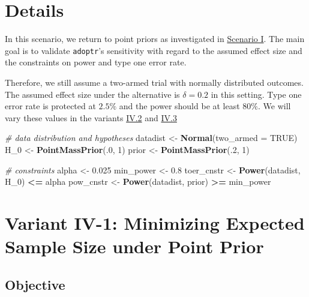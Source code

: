 \documentclass[]{book}
\newenvironment{Shaded}{\begin{snugshade}}{\end{snugshade}}
\newcommand{\CommentTok}[1]{\textcolor[rgb]{0.56,0.35,0.01}{\textit{#1}}}
\newcommand{\DataTypeTok}[1]{\textcolor[rgb]{0.13,0.29,0.53}{#1}}
\newcommand{\DecValTok}[1]{\textcolor[rgb]{0.00,0.00,0.81}{#1}}
\newcommand{\FloatTok}[1]{\textcolor[rgb]{0.00,0.00,0.81}{#1}}
\newcommand{\KeywordTok}[1]{\textcolor[rgb]{0.13,0.29,0.53}{\textbf{#1}}}
\newcommand{\NormalTok}[1]{#1}
\newcommand{\OperatorTok}[1]{\textcolor[rgb]{0.81,0.36,0.00}{\textbf{#1}}}
\newcommand{\OtherTok}[1]{\textcolor[rgb]{0.56,0.35,0.01}{#1}}
\newcommand{\StringTok}[1]{\textcolor[rgb]{0.31,0.60,0.02}{#1}}
\begin{document}
\hypertarget{details-3}{%
\section{Details}\label{details-3}}

In this scenario, we return to point priors as investigated in
\protect\hyperlink{scenarioI}{Scenario I}.
The main goal is to validate \texttt{adoptr}'s sensitivity with regard to
the assumed effect size and the constraints on power and type one error rate.

Therefore, we still assume a two-armed trial with normally distributed outcomes.
The assumed effect size under the alternative is \(\delta = 0.2\) in this setting.
Type one error rate is protected at \(2.5\%\) and the power should be at least
\(80\%\). We will vary these values in the variants \protect\hyperlink{variantIV.2}{IV.2} and
\protect\hyperlink{variantIV.3}{IV.3}

\begin{Shaded}
\begin{Highlighting}[]
\CommentTok{# data distribution and hypotheses}
\NormalTok{datadist   <-}\StringTok{ }\KeywordTok{Normal}\NormalTok{(}\DataTypeTok{two_armed =} \OtherTok{TRUE}\NormalTok{)}
\NormalTok{H_}\DecValTok{0}\NormalTok{        <-}\StringTok{ }\KeywordTok{PointMassPrior}\NormalTok{(.}\DecValTok{0}\NormalTok{, }\DecValTok{1}\NormalTok{)}
\NormalTok{prior      <-}\StringTok{ }\KeywordTok{PointMassPrior}\NormalTok{(.}\DecValTok{2}\NormalTok{, }\DecValTok{1}\NormalTok{)}

\CommentTok{# constraints}
\NormalTok{alpha      <-}\StringTok{ }\FloatTok{0.025}
\NormalTok{min_power  <-}\StringTok{ }\FloatTok{0.8}
\NormalTok{toer_cnstr <-}\StringTok{ }\KeywordTok{Power}\NormalTok{(datadist, H_}\DecValTok{0}\NormalTok{)   }\OperatorTok{<=}\StringTok{ }\NormalTok{alpha}
\NormalTok{pow_cnstr  <-}\StringTok{ }\KeywordTok{Power}\NormalTok{(datadist, prior) }\OperatorTok{>=}\StringTok{ }\NormalTok{min_power}
\end{Highlighting}
\end{Shaded}

\hypertarget{variantIV_1}{%
\section{Variant IV-1: Minimizing Expected Sample Size under Point Prior}\label{variantIV_1}}

\hypertarget{objective-7}{%
\subsection{Objective}\label{objective-7}}
\end{document}
